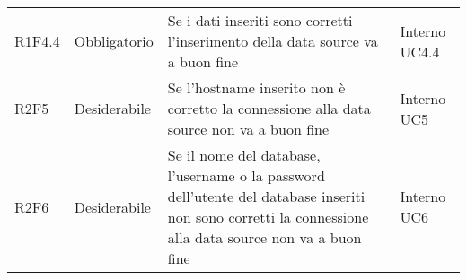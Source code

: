 \begin{longtable} {
		>{\centering}p{18mm} 
		>{\centering}p{28mm}
		>{}p{50mm} 
		>{}p{28mm}
	}
		R1F4.4 & Obbligatorio & Se i dati inseriti sono corretti l'inserimento della data source va a buon fine & Interno UC4.4 \TBstrut \\ [2mm]

        R2F5 & Desiderabile & Se l'hostname inserito non è corretto la connessione alla data source non va a buon fine & Interno UC5 \TBstrut \\ [2mm]

		R2F6 & Desiderabile & Se il nome del database, l'username o la password dell'utente del database inseriti non sono corretti la connessione alla data source non va a buon fine & Interno UC6 \TBstrut \\ [2mm]

\end{longtable}